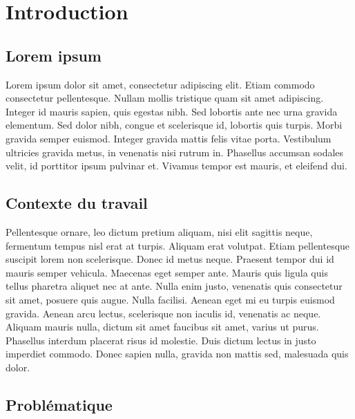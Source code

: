 \chapter*{Introduction}

\section*{Lorem ipsum}

Lorem ipsum dolor sit amet, consectetur adipiscing elit. Etiam commodo consectetur pellentesque. Nullam mollis tristique quam sit amet adipiscing. Integer id mauris sapien, quis egestas nibh. Sed lobortis ante nec urna gravida elementum. Sed dolor nibh, congue et scelerisque id, lobortis quis turpis. Morbi gravida semper euismod. Integer gravida mattis felis vitae porta. Vestibulum ultricies gravida metus, in venenatis nisi rutrum in. Phasellus accumsan sodales velit, id porttitor ipsum pulvinar et. Vivamus tempor est mauris, et eleifend dui. 

\section*{Contexte du travail}

Pellentesque ornare, leo dictum pretium aliquam, nisi elit sagittis neque, fermentum tempus nisl erat at turpis. Aliquam erat volutpat. Etiam pellentesque suscipit lorem non scelerisque. Donec id metus neque. Praesent tempor dui id mauris semper vehicula. Maecenas eget semper ante. Mauris quis ligula quis tellus pharetra aliquet nec at ante. Nulla enim justo, venenatis quis consectetur sit amet, posuere quis augue. Nulla facilisi. Aenean eget mi eu turpis euismod gravida. Aenean arcu lectus, scelerisque non iaculis id, venenatis ac neque. Aliquam mauris nulla, dictum sit amet faucibus sit amet, varius ut purus. Phasellus interdum placerat risus id molestie. Duis dictum lectus in justo imperdiet commodo. Donec sapien nulla, gravida non mattis sed, malesuada quis dolor. 

\section*{Probl\'ematique}

